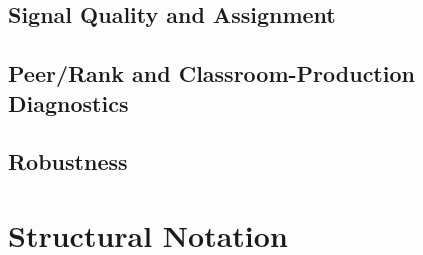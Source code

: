 \documentclass[11pt]{article}
\begin{document}
\subsection{Signal Quality and Assignment}













\subsection{Peer/Rank and Classroom-Production Diagnostics}










\subsection{Robustness}










\section{Structural Notation}
\label{app:struct_notation}
\end{document}
